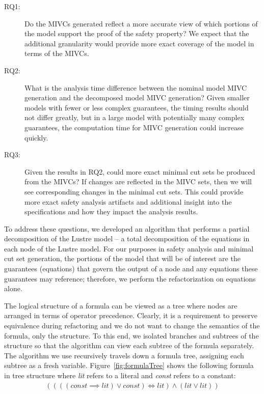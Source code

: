 \begin{description}
\item[RQ1:] Do the MIVCs generated reflect a more accurate view of which portions of the model support the proof of the safety property? We expect that the additional granularity would provide more exact coverage of the model in terms of the MIVCs. 

\item [RQ2:] What is the analysis time difference between the nominal model MIVC generation and the decomposed model MIVC generation? Given smaller models with fewer or less complex guarantees, the timing results should not differ greatly, but in a large model with potentially many complex guarantees, the computation time for MIVC generation could increase quickly. 

\item[RQ3:] Given the results in RQ2, could more exact minimal cut sets be produced from the MIVCs? If changes are reflected in the MIVC sets, then we will see corresponding changes in the minimal cut sets. This could provide more exact safety analysis artifacts and additional insight into the specifications and how they impact the analysis results. 
\end{description}

To address these questions, we developed an algorithm that performs a partial decomposition of the  Lustre model -- a total decomposition of the equations in each node of the Lustre model. For our purposes in safety analysis and minimal cut set generation, the portions of the model that will be of interest are the guarantees (equations) that govern the output of a node and any equations these guarantees may reference; therefore, we perform the refactorization on equations alone. 

The logical structure of a formula can be viewed as a tree where nodes are arranged in terms of operator precedence. Clearly, it is a requirement to preserve equivalence during refactoring and we do not want to change the semantics of the formula, only the structure. To this end, we isolated branches and subtrees of the structure so that the \aivcalg algorithm can view each subtree of the formula separately. The algorithm we use recursively travels down a formula tree, assigning each subtree as a fresh variable. Figure~\ref{fig:formulaTree} shows the following formula in tree structure where \textit{lit} refers to a literal and \textit{const} refers to a constant:
\begin{gather*}
((((\mathit{const} \implies \mathit{lit}) \lor \mathit{const}) \iff \mathit{lit} ) \land (\mathit{lit}  \lor \mathit{lit} )) 
\end{gather*} 

